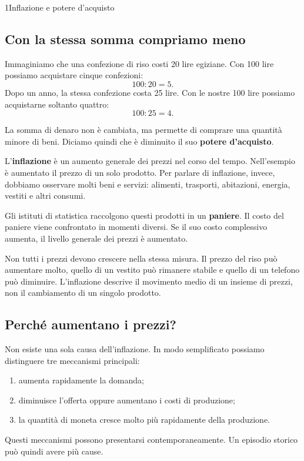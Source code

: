 \begin{lettura}{1}{Inflazione e potere d’acquisto}

\subsection*{Con la stessa somma compriamo meno}
Immaginiamo che una confezione di riso costi 20 lire egiziane. Con 100 lire possiamo acquistare cinque confezioni:
\[
100 : 20 = 5.
\]
Dopo un anno, la stessa confezione costa 25 lire. Con le nostre 100 lire possiamo acquistarne soltanto quattro:
\[
100 : 25 = 4.
\]

La somma di denaro non è cambiata, ma permette di comprare una quantità minore di beni. Diciamo quindi che è diminuito il suo \textbf{potere d'acquisto}.

L'\textbf{inflazione} è un aumento generale dei prezzi nel corso del tempo. Nell'esempio è aumentato il prezzo di un solo prodotto. Per parlare di inflazione, invece, dobbiamo osservare molti beni e servizi: alimenti, trasporti, abitazioni, energia, vestiti e altri consumi.

Gli istituti di statistica raccolgono questi prodotti in un \textbf{paniere}. Il costo del paniere viene confrontato in momenti diversi. Se il suo costo complessivo aumenta, il livello generale dei prezzi è aumentato.

Non tutti i prezzi devono crescere nella stessa misura. Il prezzo del riso può aumentare molto, quello di un vestito può rimanere stabile e quello di un telefono può diminuire. L'inflazione descrive il movimento medio di un insieme di prezzi, non il cambiamento di un singolo prodotto.

\subsection*{Perché aumentano i prezzi?}
Non esiste una sola causa dell'inflazione. In modo semplificato possiamo distinguere tre meccanismi principali:
\begin{enumerate}
\item aumenta rapidamente la domanda;
\item diminuisce l'offerta oppure aumentano i costi di produzione;
\item la quantità di moneta cresce molto più rapidamente della produzione.
\end{enumerate}

Questi meccanismi possono presentarsi contemporaneamente. Un episodio storico può quindi avere più cause.


\end{lettura}
